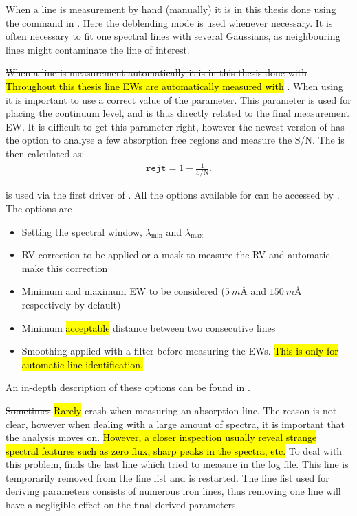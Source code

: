 When a line is measurement by hand (manually) it is in this thesis done using the 
command in . Here the deblending mode is used whenever necessary. It is often necessary
to fit one spectral lines with several Gaussians, as neighbouring lines might contaminate the line
of interest.


\st{When a line is measurement automatically it is in this thesis done with} 
\hl{Throughout this thesis line EWs are automatically measured with} 
\citep{Sousa2007,Sousa2015a}. When using  it is important to use a correct value of the
 parameter. This parameter is used for placing the continuum level, and is thus directly
related to the final measurement EW. It is difficult to get this parameter right, however the newest
version of  has the option to analyse a few absorption free regions and measure the S/N.
The  is then calculated as: \begin{align*} \mathtt{rejt} = 1 - \frac{1}{\mathrm{S/N}}.
\end{align*}

 is used via the first driver of . All the options available for 
can be accessed by . The options are
\begin{itemize}
  \item Setting the spectral window, $\lambda_\mathrm{min}$ and $\lambda_\mathrm{max}$
  \item RV correction to be applied or a mask to measure the RV and automatic make this correction
  \item Minimum and maximum EW to be considered ($\SI{5}{m\angstrom}$ and $\SI{150}{m\angstrom}$
        respectively by default)
  \item Minimum \hl{acceptable} distance between two consecutive lines
  \item Smoothing applied with a  filter before measuring the EWs. \hl{This is only for
        automatic line identification.}
\end{itemize}
An in-depth description of these options can be found in
\citet{Sousa2007,Sousa2015a}.

\st{Sometimes} \hl{Rarely}  crash when measuring an absorption line. The reason is not
clear, however when dealing with a large amount of spectra, it is important that the analysis moves
on. \hl{However, a closer inspection usually reveal strange spectral features such as zero flux,
sharp peaks in the spectra, etc.} To deal with this problem,  finds the last line which
 tried to measure in the log file. This line is temporarily removed from the line list
and  is restarted. The line list used for deriving parameters consists of numerous iron
lines, thus removing one line will have a negligible effect on the final derived parameters.



